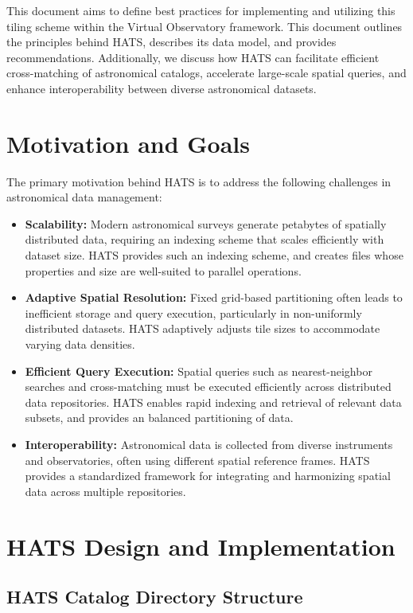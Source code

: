 \documentclass[11pt,a4paper]{ivoa}
\begin{document}
This document aims to define best practices for implementing and utilizing this tiling scheme within the Virtual Observatory framework. 
This document outlines the principles behind HATS, describes its data model, and provides recommendations. 
Additionally, we discuss how HATS can facilitate efficient cross-matching of astronomical catalogs, accelerate large-scale spatial queries, and enhance interoperability between diverse astronomical datasets.

\section{Motivation and Goals}
The primary motivation behind HATS is to address the following challenges in astronomical data management:
\begin{itemize}
    \item \textbf{Scalability:} Modern astronomical surveys generate petabytes of spatially distributed data, requiring an indexing scheme that scales efficiently with dataset size.
    HATS provides such an indexing scheme, and creates files whose properties and size are well-suited to parallel operations.
    \item \textbf{Adaptive Spatial Resolution:} Fixed grid-based partitioning often leads to inefficient storage and query execution, particularly in non-uniformly distributed datasets. 
    HATS adaptively adjusts tile sizes to accommodate varying data densities.
    \item \textbf{Efficient Query Execution:} Spatial queries such as nearest-neighbor searches and cross-matching must be executed efficiently across distributed data repositories. 
    HATS enables rapid indexing and retrieval of relevant data subsets, and provides an balanced partitioning of data.
    \item \textbf{Interoperability:} Astronomical data is collected from diverse instruments and observatories, often using different spatial reference frames. 
    HATS provides a standardized framework for integrating and harmonizing spatial data across multiple repositories.
\end{itemize}

\section{HATS Design and Implementation}

\subsection{HATS Catalog Directory Structure} \label{sec:catalog}
\end{document}
